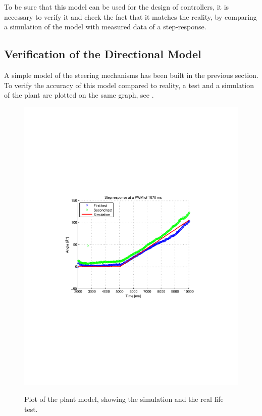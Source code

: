 To be sure that this model can be used for the design of controllers, it is necessary to verify it and check the fact that it matches the reality, by comparing a simulation of the model with measured data of a step-response.

\subsection{Verification of the Directional Model}
A simple model of the steering mechanisms has been built in the previous section.
To verify the accuracy of this model compared to reality, a test and a simulation of the plant are plotted on the same graph, see .

\begin{figure}[H]
  \centering
   { \includegraphics[scale=0.8]{figures/plotVerificationSteeringPlant.pdf} }
 \caption{Plot of the plant model, showing the simulation and the real life test.}
  \label{fig:plotVerificationSteeringPlant}
\end{figure}


